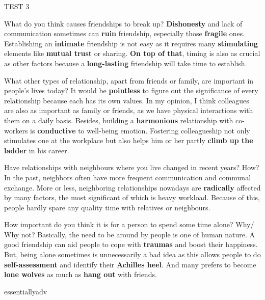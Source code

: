 \begin{glossarymc}[Cambridge 5]
\begin{test}{TEST 3}
    \begin{qa}{What do you think causes friendships to break up?}
        \textbf{Dishonesty} and lack of communication sometimes can \textbf{ruin} friendship, especially those \textbf{fragile} ones. Establishing an \textbf{intimate} friendship is not easy as it requires many \textbf{stimulating} elements like \textbf{mutual trust} or sharing. \textbf{On top of that}, timing is also as crucial as other factors because a \textbf{long-lasting} friendship will take time to establish.
    \end{qa}

    \begin{qa}{What other types of relationship, apart from friends or family, are important in people's lives today?}
         It would be \textbf{pointless} to figure out the significance of every relationship because each has its own values. In my opinion, I think colleagues are also as important as family or friends, as we have physical interactions with them on a daily basis. Besides, building a \textbf{harmonious} relationship with co-workers is \textbf{conductive} to well-being emotion. Fostering colleagueship not only stimulates one at the workplace but also helps him or her partly \textbf{climb up the ladder} in his career.
    \end{qa}

    \begin{qa}{Have relationships with neighbours where you live changed in recent years? How?}
        In the past, neighbors often have more frequent communication and communal exchange. More or less, neighboring relationships nowadays are \textbf{radically} affected by many factors, the most significant of which is heavy workload. Because of this, people hardly spare any quality time with relatives or neighbours.
    \end{qa}

    \begin{qa}{How important do you think it is for a person to spend some time alone? Why/ Why not?}
        Basically, the need to be around by people is one of human nature. A good friendship can aid people to cope with \textbf{traumas} and boost their happiness. But, being alone sometimes is unnecessarily a bad idea as this allows people to do \textbf{self-assessment} and identify their \textbf{Achilles heel}. And many prefers to become \textbf{lone wolves} as much as \textbf{hang out} with friends.
    \end{qa}

        \begin{VocabExplain}[Part 3]
            \begin{ExplainCard}{essentially}{adv}
            \end{ExplainCard}


\end{VocabExplain}
\end{test}
\end{glossarymc}
